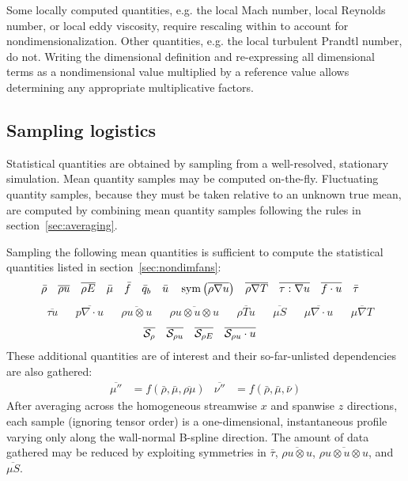 Some locally computed quantities, e.g. the local Mach number, local Reynolds
number, or local eddy viscosity, require rescaling within to account for
nondimensionalization.  Other quantities, e.g. the local turbulent Prandtl
number, do not.  Writing the dimensional definition and re-expressing all
dimensional terms as a nondimensional value multiplied by a reference value
allows determining any appropriate multiplicative factors.

\subsection{Sampling logistics}

Statistical quantities are obtained by sampling from a well-resolved,
stationary simulation.  Mean quantity samples may be computed on-the-fly.
Fluctuating quantity samples, because they must be taken relative to an unknown
true mean, are computed by combining mean quantity samples following the rules
in section~\ref{sec:averaging}.

Sampling the following mean quantities is sufficient to compute
the statistical quantities listed in section~\ref{sec:nondimfans}:
\begin{align}
&\bar{\rho}
&
&\overline{\rho{}u}
&
&\overline{\rho{}E}
&
&\bar{\mu}
&
&\bar{f}
&
&\bar{q}_b
&
&\bar{u}
&
&\operatorname{sym}\left(\overline{\rho\nabla{}u}\right)
&
&\overline{\rho\nabla{}T}
&
&\overline{\tau:\nabla{}u}
&
&\overline{f\cdot{}u}
&
&\bar{\tau}
\end{align}
\begin{align}
&\overline{\tau{}u}
&
&\overline{p\nabla\cdot{}u}
&
&\overline{\rho{}u\otimes{}u}
&
&\overline{\rho{}u\otimes{}u\otimes{}u}
&
&\overline{\rho{}Tu}
&
&\overline{\mu{}S}
&
&\overline{\mu\nabla\cdot{}u}
&
&\overline{\mu\nabla{}T}
\end{align}
\begin{align}
&\overline{\mathcal{S}_{\rho{}}}
&
&\overline{\mathcal{S}_{\rho{} u}}
&
&\overline{\mathcal{S}_{\rho{} E}}
&
&\overline{\mathcal{S}_{\rho{} u}\cdot{}u}
\end{align}
These additional quantities are of interest and their so-far-unlisted
dependencies are also gathered:
\begin{align}
  \overline{\mu{}''}&= f\left(
      \bar{\rho}, \bar{\mu}, \overline{\rho\mu}
  \right)
  &
  \overline{\nu{}''} &= f\left(
      \bar{\rho}, \bar{\mu}, \bar{\nu}
  \right)
\end{align}
After averaging across the homogeneous streamwise $x$ and spanwise $z$
directions, each sample (ignoring tensor order) is a one-dimensional,
instantaneous profile varying only along the wall-normal B-spline direction.
The amount of data gathered may be reduced by exploiting symmetries in
$\bar{\tau}$, $\overline{\rho{}u\otimes{}u}$,
$\overline{\rho{}u\otimes{}u\otimes{}u}$, and $\overline{\mu{}S}$.

